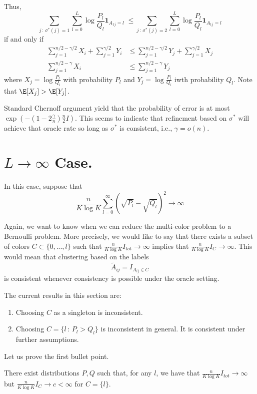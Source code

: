 \documentclass{article}
\begin{document}
Thus, 
\[
\sum_{j \,:\, \sigma^*(j) = 1} \sum_{l=0}^L \log \frac{P_l}{Q_l} \mathbf{1}_{A_{1j}= l}
 \;\leq \sum_{j \,:\, \sigma^*(j) = 2} \sum_{l=0}^L \log \frac{P_l}{Q_l} \mathbf{1}_{A_{1j}= l} 
\]
if and only if 
\begin{align*}
\sum_{j=1}^{n/2 - \gamma/2} X_i + \sum_{j=1}^{\gamma/2} Y_i &\leq \sum_{j=1}^{n/2 - \gamma/2} Y_j + \sum_{j=1}^{\gamma/2} X_j \\
\sum_{j=1}^{n/2 - \gamma} X_i  &\leq \sum_{j=1}^{n/2 - \gamma} Y_j
\end{align*}
where $X_j = \log \frac{P_l}{Q_l}$ with probability $P_l$ and $Y_j = \log \frac{P_l}{Q_l}$ iwth probability $Q_l$. Note that $\E[X_j] > \E[Y_j]$.

Standard Chernoff argument yield that the probability of error is at most $\exp( - (1 - 2\frac{\gamma}{n}) \frac{n}{2} I)$. This seems to indicate that refinement based on $\sigma^*$ will achieve that oracle rate so long as $\sigma^*$ is consistent, i.e., $\gamma = o(n)$. 

\section{$L \rightarrow \infty$ Case.}

In this case, suppose that
\[
\frac{n}{K \log K} \sum_{l=0}^\infty (\sqrt{P_l} - \sqrt{Q_l})^2  \rightarrow \infty
\]

Again, we want to know when we can reduce the multi-color problem to a Bernoulli problem. More precisely, we would like to say that there exists a subset of colors $C \subset \{0,...,l\}$ such that $ \frac{n}{K \log K} I_{tot} \rightarrow \infty$ implies that $\frac{n}{K \log K} I_C \rightarrow \infty$. This would mean that clustering based on the labels 
\[
\tilde{A}_{ij} = I_{A_{ij} \in C}
\]
is consistent whenever consistency is possible under the oracle setting. 

The current results in this section are:
\begin{enumerate}
\item Choosing $C$ as a singleton is inconsistent. 
\item Choosing $C = \{ l \,:\, P_l > Q_l\}$ is inconsistent in general. It is consistent under further assumptions.
\end{enumerate}

Let us prove the first bullet point.
\begin{proposition}
There exist distributions $P, Q$ such that, for any $l$, we have that 
$ \frac{n}{K \log K} I_{tot} \rightarrow \infty$ but $\frac{n}{K \log K} I_C \rightarrow c < \infty$ for $C = \{l\}$. 
\end{proposition}
\end{document}
